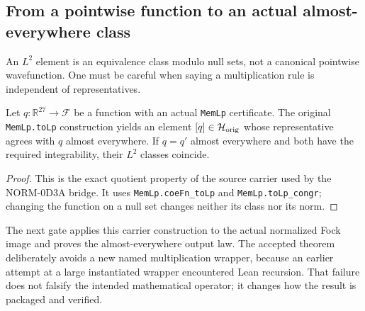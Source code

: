 \subsection{From a pointwise function to an actual almost-everywhere class}
An $L^2$ element is an equivalence class modulo null sets, not a
canonical pointwise wavefunction. One must be careful when saying a
multiplication rule is independent of representatives.

\begin{lemma}\label{lem:norm-carrier}
Let $q:\mathbb R^{27}\to\mathcal F$ be a function with an actual
\texttt{MemLp} certificate. The original \texttt{MemLp.toLp}
construction yields an element $[q]\in\mathcal H_{\mathrm{orig}}$ whose
representative agrees with $q$ almost everywhere. If $q=q'$ almost
everywhere and both have the required integrability, their $L^2$
classes coincide.
\end{lemma}
\begin{proof}
This is the exact quotient property of the source carrier used by the
NORM-0D3A bridge. It uses \texttt{MemLp.coeFn\_toLp} and
\texttt{MemLp.toLp\_congr}; changing the function on a null set
changes neither its class nor its norm.
\end{proof}

The next gate applies this carrier construction to the actual
normalized Fock image and proves the almost-everywhere output law.
The accepted theorem deliberately avoids a new named multiplication
wrapper, because an earlier attempt at a large instantiated wrapper
encountered Lean recursion. That failure does not falsify the intended
mathematical operator; it changes how the result is packaged and
verified.

